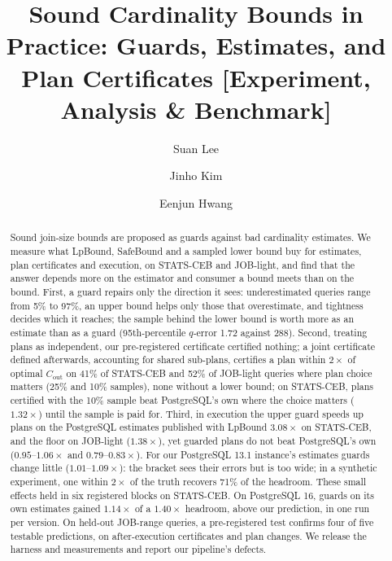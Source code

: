 \documentclass[sigconf, nonacm]{acmart}
\begin{document}
\title{Sound Cardinality Bounds in Practice: Guards, Estimates, and Plan
Certificates [Experiment, Analysis \& Benchmark]}

\author{Suan Lee}

\author{Jinho Kim}

\author{Eenjun Hwang}

\begin{abstract}
Sound join-size bounds are proposed as guards against bad cardinality
estimates. We measure what LpBound, SafeBound and a sampled lower bound buy
for estimates, plan certificates and execution, on STATS-CEB and JOB-light,
and find that the answer depends more on the estimator and consumer a bound
meets than on the bound. First, a guard repairs only the direction it sees:
underestimated queries range from 5\%
to 97\%, an upper bound helps only those that overestimate, and tightness
decides which it reaches; the sample behind the lower bound is worth more as an estimate than as a guard
(95th-percentile $q$-error 1.72 against 288). Second, treating plans as independent,
our pre-registered certificate certified nothing; a joint certificate
defined afterwards, accounting for shared sub-plans, certifies a plan within $2\times$ of optimal
$C_{\mathrm{out}}$ on 41\% of STATS-CEB and 52\% of JOB-light queries where
plan choice matters (25\% and 10\% samples), none without a lower bound; on
STATS-CEB, plans certified with the 10\% sample beat PostgreSQL's own where the
choice matters ($1.32\times$) until the sample is paid for. Third,
in execution the upper guard speeds up plans on the PostgreSQL estimates
published with LpBound $3.08\times$ on STATS-CEB, and the floor on JOB-light
($1.38\times$), yet guarded plans do not beat PostgreSQL's own
($0.95$--$1.06\times$ and $0.79$--$0.83\times$). For our PostgreSQL 13.1
instance's estimates guards change little ($1.01$--$1.09\times$): the bracket
sees their errors but is too wide; in a synthetic experiment, one within
$2\times$ of the truth recovers 71\% of the headroom. These small effects held
in six registered blocks on STATS-CEB. On PostgreSQL 16, guards on its own estimates
gained $1.14\times$ of a $1.40\times$ headroom, above our prediction, in one
run per version. On held-out JOB-range queries, a pre-registered test confirms four of five testable predictions, on
after-execution certificates and plan changes. We release the harness and
measurements and report our pipeline's defects.
\end{abstract}
\end{document}
